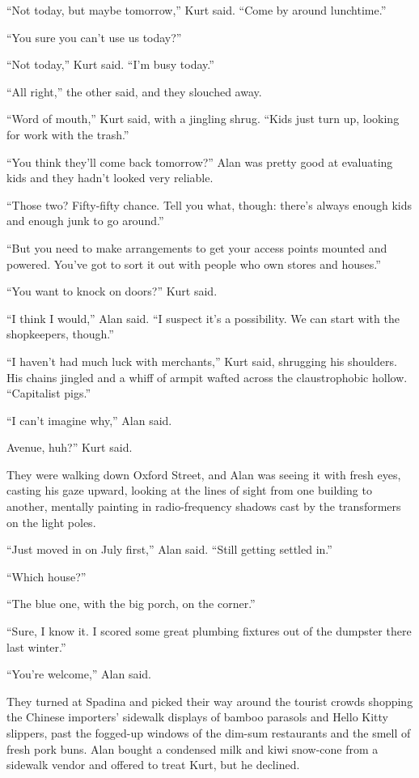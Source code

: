 ``Not today, but maybe tomorrow,'' Kurt said.  ``Come by around
lunchtime.''

``You sure you can't use us today?''

``Not today,'' Kurt said.  ``I'm busy today.''

``All right,'' the other said, and they slouched away.

``Word of mouth,'' Kurt said, with a jingling shrug.  ``Kids just turn
up, looking for work with the trash.''

``You think they'll come back tomorrow?'' Alan was pretty good at
evaluating kids and they hadn't looked very reliable.

``Those two?  Fifty-fifty chance.  Tell you what, though:  there's
always enough kids and enough junk to go around.''

``But you need to make arrangements to get your access points mounted
and powered.  You've got to sort it out with people who own stores and
houses.''

``You want to knock on doors?'' Kurt said.

``I think I would,'' Alan said.  ``I suspect it's a possibility.  We
can start with the shopkeepers, though.''

``I haven't had much luck with merchants,'' Kurt said, shrugging his
shoulders.  His chains jingled and a whiff of armpit wafted across the
claustrophobic hollow.  ``Capitalist pigs.''

``I can't imagine why,'' Alan said.

 Avenue, huh?'' Kurt said.

They were walking down Oxford Street, and Alan was seeing it with
fresh eyes, casting his gaze upward, looking at the lines of sight
from one building to another, mentally painting in radio-frequency
shadows cast by the transformers on the light poles.

``Just moved in on July first,'' Alan said.  ``Still getting settled
in.''

``Which house?''

``The blue one, with the big porch, on the corner.''

``Sure, I know it.  I scored some great plumbing fixtures out of the
dumpster there last winter.''

``You're welcome,'' Alan said.

They turned at Spadina and picked their way around the tourist crowds
shopping the Chinese importers' sidewalk displays of bamboo parasols
and Hello Kitty slippers, past the fogged-up windows of the dim-sum
restaurants and the smell of fresh pork buns.  Alan bought a condensed
milk and kiwi snow-cone from a sidewalk vendor and offered to treat
Kurt, but he declined.

